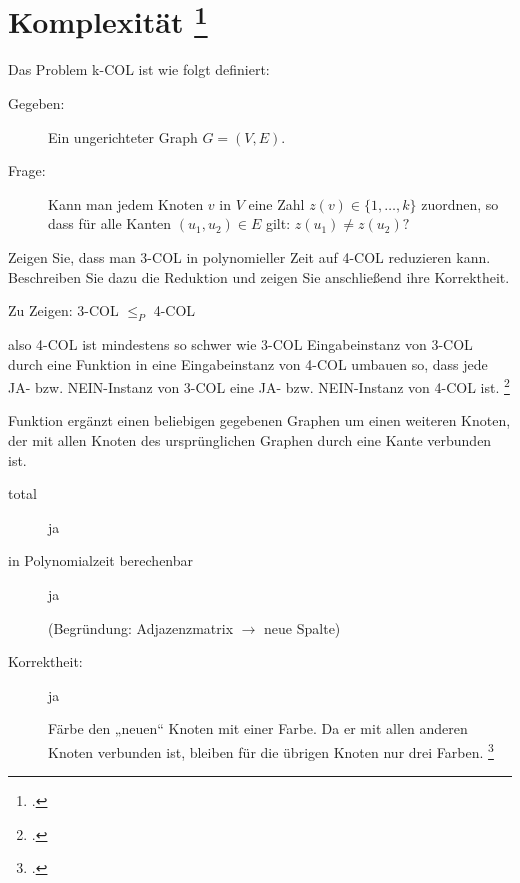 \documentclass{lehramt-informatik-aufgabe}
\begin{document}
\section{Komplexität
\footcite{66115:2016:03}}

Das Problem k-COL ist wie folgt definiert:

\begin{description}
\item[Gegeben:]

Ein ungerichteter Graph $G = (V, E)$.

\item[Frage:]

Kann man jedem Knoten $v$ in $V$ eine Zahl $z(v) \in \{1, \dots ,k\}$
zuordnen, so dass für alle Kanten $(u_1,u_2) \in E$ gilt: $z(u_1) \neq
z(u_2)?$
\end{description}

Zeigen Sie, dass man 3-COL in polynomieller Zeit auf 4-COL reduzieren
kann. Beschreiben Sie dazu die Reduktion und zeigen Sie anschließend
ihre Korrektheit.

\begin{liAntwort}
Zu Zeigen: 3-COL $\leq_P$ 4-COL

also 4-COL ist mindestens so schwer wie 3-COL Eingabeinstanz von 3-COL
durch eine Funktion in eine Eingabeinstanz von 4-COL umbauen so, dass
jede JA- bzw. NEIN-Instanz von 3-COL eine JA- bzw. NEIN-Instanz von
4-COL ist.
\footcite[Seite 67]{theo:fs:4}

Funktion ergänzt einen beliebigen gegebenen Graphen um einen
weiteren Knoten, der mit allen Knoten des ursprünglichen Graphen
durch eine Kante verbunden ist.

\begin{description}
\item[total] ja

\item[in Polynomialzeit berechenbar] ja

(Begründung: \zB Adjazenzmatrix $\rightarrow$ neue Spalte)

\item[Korrektheit:] ja

Färbe den „neuen“ Knoten mit einer Farbe. Da er mit allen anderen Knoten
verbunden ist, bleiben für die übrigen Knoten nur drei Farben.
\footcite[Seite 69]{theo:fs:4}
\end{description}
\end{liAntwort}
\end{document}
